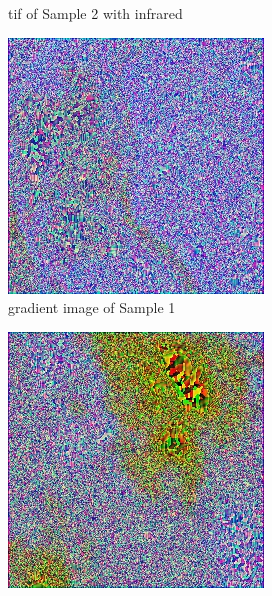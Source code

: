 \documentclass[10pt,twocolumn,letterpaper]{article}
\begin{document}
\begin{figure}
\begin{subfigure}{.5\columnwidth}
\caption{tif of Sample 2 with infrared}
\end{subfigure}
\begin{subfigure}{.5\columnwidth}
\includegraphics[width=0.9\columnwidth]{sample_images/train_1_grad.jpg}
\caption{gradient image of Sample 1}
\end{subfigure}%
\begin{subfigure}{.5\columnwidth}
\includegraphics[width=0.9\columnwidth]{sample_images/train_1000_grad.jpg}

\end{subfigure}
\end{figure}
\end{document}
